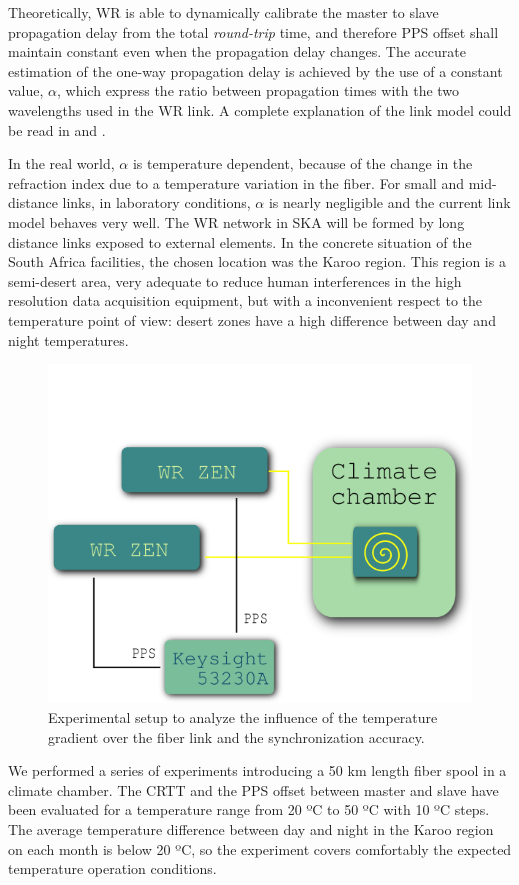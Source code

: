 Theoretically, WR is able to dynamically calibrate the master to slave 
propagation delay from the total \textit{round-trip} time, and therefore PPS 
offset shall maintain constant even when the propagation delay changes. The 
accurate estimation of the one-way propagation delay is achieved by the use of 
a constant value, $\alpha$, which express the ratio between propagation times 
with the two wavelengths used in the WR link. A complete explanation of the 
link model could be read in \cite{Wlostowski2011} and \cite{Daniluk2012}.

In the real world, $\alpha$ is temperature dependent, because of the change in 
the refraction index due to a temperature variation in the fiber. For small and 
mid-distance links, in laboratory conditions, $\alpha$ is nearly negligible and 
the current link model behaves very well. The WR network in SKA will be formed 
by long distance links exposed to external elements. In the concrete situation 
of the South Africa facilities, the chosen location was the Karoo region. 
 This region is a 
semi-desert area, very adequate to reduce human interferences in the high 
resolution data acquisition equipment, but with a inconvenient respect to the 
temperature point of view: desert zones have a high difference between day 
and night temperatures.

\begin{figure}
	\centering
	\includegraphics[width=0.7\linewidth]{img/tempsetup}
	\caption[Configuration of the climate chamber experiments]{Experimental 
		setup to analyze the influence of the temperature gradient over the 
		fiber link and the synchronization accuracy.}
	\label{fig:tempsetup}
\end{figure}

We performed a series of experiments introducing a 50 km length fiber spool in 
a climate chamber. The CRTT and the PPS offset between master and slave have 
been evaluated for a temperature range from 20 ºC to 50 ºC with 10 ºC steps. 
The average temperature difference between day and night in the Karoo region on 
each month is below 20 ºC, so the experiment covers comfortably the expected 
temperature operation conditions.

